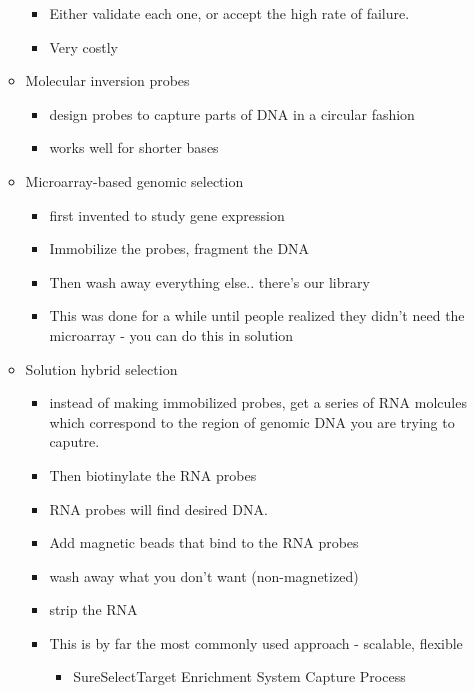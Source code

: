 \documentclass{article}
\begin{document}
\begin{itemize}
\begin{itemize}
\begin{itemize}
                \item Either validate each one, or accept the high rate of  failure.
                \item Very costly
            \end{itemize}
            \item Molecular inversion probes
            \begin{itemize}
                \item design probes to capture parts of DNA in a circular fashion
                \item works well for shorter bases
            \end{itemize}
            \item Microarray-based genomic selection
            \begin{itemize}
                \item first invented to study gene expression
                \item Immobilize the probes, fragment the DNA
                \item Then wash away everything else.. there's our library
                \item This was done for a while until people realized they didn't need the microarray - you can do this in solution
            \end{itemize}
            \item Solution hybrid selection
            \begin{itemize}
                \item instead of making immobilized probes, get a series of RNA molcules which correspond to the region of genomic DNA you are trying to caputre.
                \item Then biotinylate the RNA probes
                \item RNA probes will find desired DNA.
                \item Add magnetic beads that bind to the RNA probes
                \item wash away what you don't want (non-magnetized)
                \item strip the RNA
                \item This is by far the most commonly used approach - scalable, flexible
                \begin{itemize}
                    \item SureSelect\texttrademark Target Enrichment System Capture Process
                \end{itemize}

\end{itemize}
\end{itemize}
\end{itemize}
\end{document}
